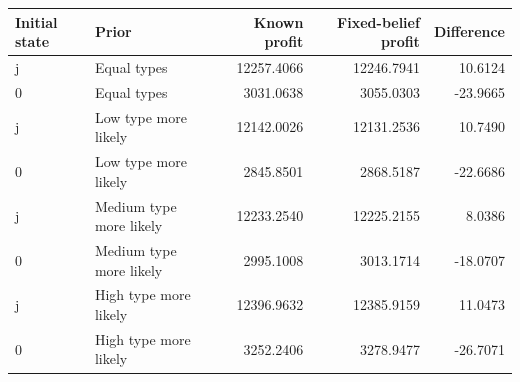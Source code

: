 \begin{tabular}{llrrr}\hline
Initial state & Prior & Known profit & Fixed-belief profit & Difference\\\hline
j & Equal types & 12257.4066 & 12246.7941 & 10.6124 \\
0 & Equal types & 3031.0638 & 3055.0303 & -23.9665 \\
j & Low type more likely & 12142.0026 & 12131.2536 & 10.7490 \\
0 & Low type more likely & 2845.8501 & 2868.5187 & -22.6686 \\
j & Medium type more likely & 12233.2540 & 12225.2155 & 8.0386 \\
0 & Medium type more likely & 2995.1008 & 3013.1714 & -18.0707 \\
j & High type more likely & 12396.9632 & 12385.9159 & 11.0473 \\
0 & High type more likely & 3252.2406 & 3278.9477 & -26.7071 \\
\hline\end{tabular}
